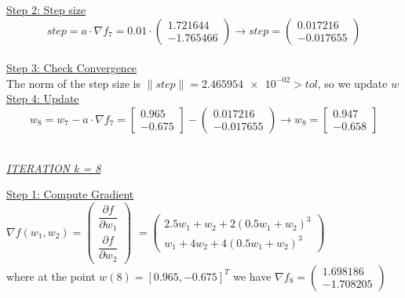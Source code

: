 \underline{Step 2: Step size}
\[
step = a \cdot \nabla f_{7} = 0.01 \cdot \left(\begin{array}{c}
	1.721644 \\
-1.765466
\end{array}\right) \rightarrow step =\left(\begin{array}{c}
0.017216 \\
-0.017655
\end{array}\right)
\]
\\[4mm]

\underline{Step 3: Check Convergence}\\
The norm of the step size is $\| step \| = \num{2.465954e-02} > tol$, so we update $w$
\\[4mm]

\underline{Step 4: Update}
\[ 
w_8 = w_7 - a\cdot \nabla f_7 =  \left[\begin{array}{c}
	0.965\\
-0.675
\end{array}\right] - \left(\begin{array}{c}
0.017216 \\
-0.017655
\end{array}\right) \rightarrow
w_8 = \left[\begin{array}{c}
	0.947\\
	-0.658
\end{array}\right]
\]
\\[4mm]

\begin{center}
	\underline{\textit{ITERATION k = 8}}
\end{center}

\underline{Step 1: Compute Gradient}\\
\(\nabla f(w_1,w_2) = \left(\begin{array}{c}
	\dfrac{\partial f}{\partial w_1} \\[4mm]
	\dfrac{\partial f}{\partial w_2}
\end{array}\right)\) $= \left(\begin{array}{c}
	2.5w_1 + w_2 + 2(0.5w_1+w_2)^3\\[1mm]
	w_1 + 4w_2 + 4(0.5w_1+w_2)^3
\end{array}\right)$ \\[3mm]

where at the point $w\left(8\right) = \left[0.965, -0.675\right]^T$ we have $\nabla f_{8} = \left(\begin{array}{c}
	1.698186 \\
	-1.708205
\end{array}\right)$
\\[4mm]

